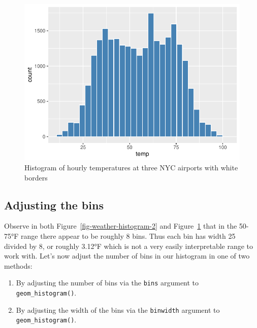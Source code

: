 \documentclass[
  letterpaper,
  DIV=11,
  numbers=noendperiod]{scrreprt}
\providecommand{\tightlist}{%
  \setlength{\itemsep}{0pt}\setlength{\parskip}{0pt}}\usepackage{longtable,booktabs,array}
\theoremstyle{definition}
\theoremstyle{remark}
\begin{document}
\begin{figure}[H]

{\centering \includegraphics{02-visualization_files/figure-pdf/fig-weather-histogram-3-1.pdf}

}

\caption{\label{fig-weather-histogram-3}Histogram of hourly temperatures
at three NYC airports with white borders}

\end{figure}

\hypertarget{sec-adjustbins}{%
\subsection{Adjusting the bins}\label{sec-adjustbins}}

Observe in both Figure~\ref{fig-weather-histogram-2} and
Figure~\ref{fig-weather-histogram-3} that in the 50-75°F range there
appear to be roughly 8 bins. Thus each bin has width 25 divided by 8, or
roughly 3.12°F which is not a very easily interpretable range to work
with. Let's now adjust the number of bins in our histogram in one of two
methods:

\begin{enumerate}
\def\labelenumi{\arabic{enumi}.}
\tightlist
\item
  By adjusting the number of bins via the \texttt{bins} argument to
  \texttt{geom\_histogram()}.
\item
  By adjusting the width of the bins via the \texttt{binwidth} argument
  to \texttt{geom\_histogram()}.
\end{enumerate}
\end{document}
